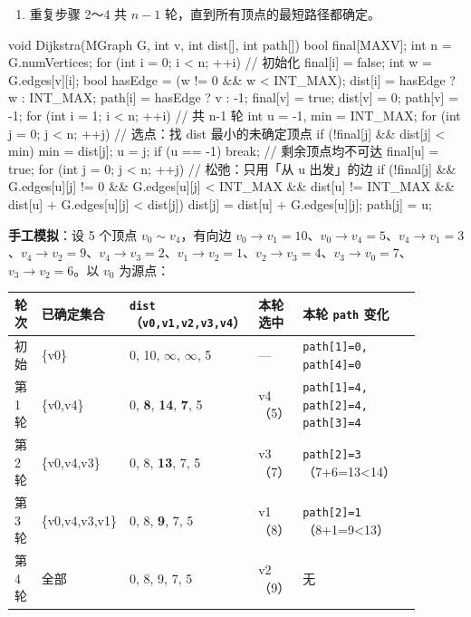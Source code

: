 \documentclass[11pt,openany,UTF8]{ctexbook}
\begin{document}
\begin{enumerate}
\item 重复步骤 2～4 共 $n-1$ 轮，直到所有顶点的最短路径都确定。
\end{enumerate}
\begin{codebox}
void Dijkstra(MGraph G, int v, int dist[], int path[]) {
    bool final[MAXV];
    int n = G.numVertices;
    for (int i = 0; i < n; ++i) {                 // 初始化
        final[i] = false;
        int w = G.edges[v][i];
        bool hasEdge = (w != 0 && w < INT_MAX);
        dist[i] = hasEdge ? w : INT_MAX;
        path[i] = hasEdge ? v : -1;
    }
    final[v] = true; dist[v] = 0; path[v] = -1;
    for (int i = 1; i < n; ++i) {                 // 共 n-1 轮
        int u = -1, min = INT_MAX;
        for (int j = 0; j < n; ++j)               // 选点：找 dist 最小的未确定顶点
            if (!final[j] && dist[j] < min) { min = dist[j]; u = j; }
        if (u == -1) break;                       // 剩余顶点均不可达
        final[u] = true;
        for (int j = 0; j < n; ++j) {             // 松弛：只用「从 u 出发」的边
            if (!final[j] && G.edges[u][j] != 0 && G.edges[u][j] < INT_MAX
                && dist[u] != INT_MAX
                && dist[u] + G.edges[u][j] < dist[j]) {
                dist[j] = dist[u] + G.edges[u][j];
                path[j] = u;
            }
        }
    }
}
\end{codebox}

\textbf{手工模拟}：设 5 个顶点 $v_0\sim v_4$，有向边 $v_0\to v_1=10$、$v_0\to v_4=5$、$v_4\to v_1=3$、$v_4\to v_2=9$、$v_4\to v_3=2$、$v_1\to v_2=1$、$v_2\to v_3=4$、$v_3\to v_0=7$、$v_3\to v_2=6$。以 $v_0$ 为源点：

\begingroup\small\setlength{\tabcolsep}{4.0pt}
\begin{longtable}{@{}L{0.0769\linewidth}L{0.1314\linewidth}L{0.2820\linewidth}L{0.0801\linewidth}L{0.3237\linewidth}@{}}
\toprule
\textbf{轮次} & \textbf{已确定集合} & \textbf{\texttt{dist}（\texttt{v0,\allowbreak{}v1,\allowbreak{}v2,\allowbreak{}v3,\allowbreak{}v4}）} & \textbf{本轮选中} & \textbf{本轮 \texttt{path} 变化} \\
\midrule
\endhead
初始 & \{v0\} & 0, 10, $\infty$, $\infty$, 5 & — & \texttt{path[1]\allowbreak{}=\allowbreak{}0,\allowbreak{} path[4]\allowbreak{}=\allowbreak{}0} \\
第 1 轮 & \{v0,v4\} & 0, \textbf{8}, \textbf{14}, \textbf{7}, 5 & v4（5） & \texttt{path[1]\allowbreak{}=\allowbreak{}4,\allowbreak{} path[2]\allowbreak{}=\allowbreak{}4,\allowbreak{} path[3]\allowbreak{}=\allowbreak{}4} \\
第 2 轮 & \{v0,v4,v3\} & 0, 8, \textbf{13}, 7, 5 & v3（7） & \texttt{path[2]\allowbreak{}=\allowbreak{}3}（7+6=13<14） \\
第 3 轮 & \{v0,v4,v3,v1\} & 0, 8, \textbf{9}, 7, 5 & v1（8） & \texttt{path[2]\allowbreak{}=\allowbreak{}1}（8+1=9<13） \\
第 4 轮 & 全部 & 0, 8, 9, 7, 5 & v2（9） & 无 \\
\bottomrule
\end{longtable}
\endgroup
\end{document}
